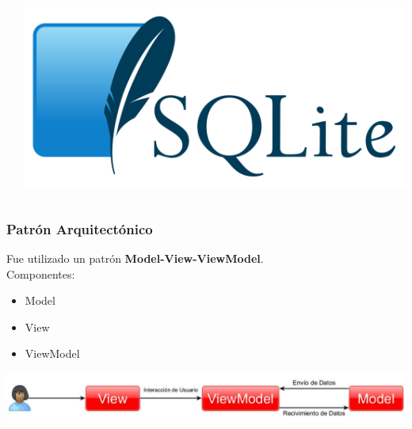 \documentclass[14pt]{beamer}
\begin{document}
\begin{frame}
\begin{columns}
\begin{column}{0.3\textwidth}
\begin{center}
\end{center}
\end{column}

\begin{column}{0.3\textwidth}
\begin{center}
\includegraphics[scale =0.08]{Images/LogodeSQLite.png}\\

\end{center}
\end{column}
\end{columns}


\end{frame}


\begin{frame}
\frametitle{Patrón Arquitectónico}

Fue utilizado un patrón \textbf{Model-View-ViewModel}.
\\
Componentes:
\begin{itemize}
\item Model
\item View
\item ViewModel
\end{itemize}

\begin{center}

\includegraphics[scale =0.3]{Images/mvvm.jpg}


\end{center}

\end{frame}
\end{document}
